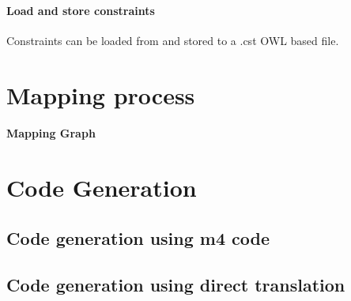 \paragraph{Load and store constraints}

Constraints can be loaded from and stored to a .cst OWL based file.

\section{Mapping process}

\paragraph{Mapping Graph}

\section{Code Generation}

\subsection{Code generation using m4 code}
\subsection{Code generation using direct translation}
